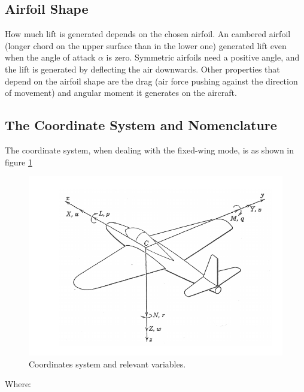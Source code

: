 \subsection{Airfoil Shape}
How much lift is generated depends on the chosen airfoil.
%
An cambered airfoil (longer chord on the upper surface than in the lower one) generated lift even when the angle of attack $\alpha$ is zero.
Symmetric airfoils need a positive angle, and the lift is generated by deflecting the air downwards.
Other properties that depend on the airfoil shape are the drag (air force pushing against the direction of movement) and angular moment it generates on the aircraft. 

\subsection{The Coordinate System and Nomenclature}

The coordinate system, when dealing with the fixed-wing mode, is as shown in figure \ref{fig:coords1}

\begin{figure}
\centering
  \includegraphics[width=\linewidth]{figs/axis1.png}
  \caption{Coordinates system and relevant variables.}
  \label{fig:coords1}
\end{figure}

Where:


